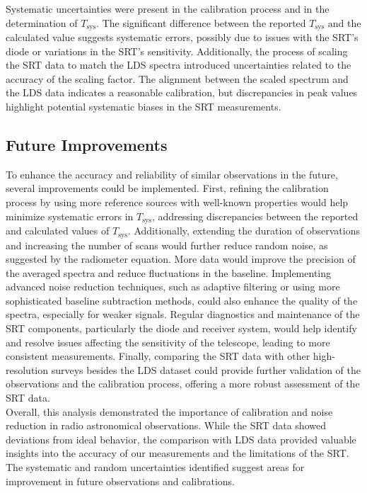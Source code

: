 \documentclass[linenumbers,twocolumn]{aastex631}
\begin{document}
Systematic uncertainties were present in the calibration process and in the determination of $T_{\text{sys}}$. The significant difference between the reported $T_{\text{sys}}$ and the calculated value suggests systematic errors, possibly due to issues with the SRT’s diode or variations in the SRT’s sensitivity. Additionally, the process of scaling the SRT data to match the LDS spectra introduced uncertainties related to the accuracy of the scaling factor. The alignment between the scaled spectrum and the LDS data indicates a reasonable calibration, but discrepancies in peak values highlight potential systematic biases in the SRT measurements.

\subsection{Future Improvements}

To enhance the accuracy and reliability of similar observations in the future, several improvements could be implemented. First, refining the calibration process by using more reference sources with well-known properties would help minimize systematic errors in $T_{\text{sys}}$, addressing discrepancies between the reported and calculated values of $T_{\text{sys}}$. Additionally, extending the duration of observations and increasing the number of scans would further reduce random noise, as suggested by the radiometer equation. More data would improve the precision of the averaged spectra and reduce fluctuations in the baseline. Implementing advanced noise reduction techniques, such as adaptive filtering or using more sophisticated baseline subtraction methods, could also enhance the quality of the spectra, especially for weaker signals. Regular diagnostics and maintenance of the SRT components, particularly the diode and receiver system, would help identify and resolve issues affecting the sensitivity of the telescope, leading to more consistent measurements. Finally, comparing the SRT data with other high-resolution surveys besides the LDS dataset could provide further validation of the observations and the calibration process, offering a more robust assessment of the SRT data. \\

Overall, this analysis demonstrated the importance of calibration and noise reduction in radio astronomical observations. While the SRT data showed deviations from ideal behavior, the comparison with LDS data provided valuable insights into the accuracy of our measurements and the limitations of the SRT. The systematic and random uncertainties identified suggest areas for improvement in future observations and calibrations.
\end{document}
